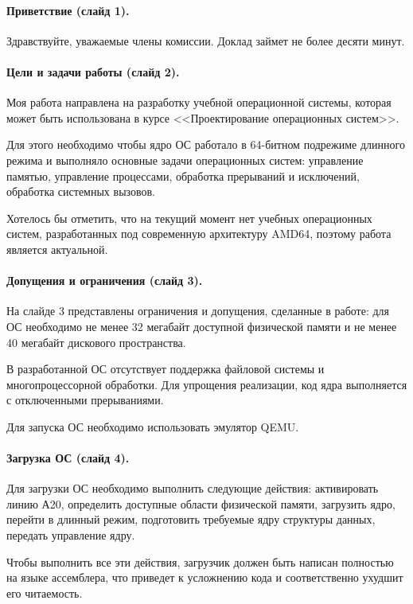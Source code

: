 \documentclass[12pt]{article}
\begin{document}
\paragraph{Приветствие (слайд 1).}
Здравствуйте, уважаемые члены комиссии. Доклад займет не более десяти минут.

\paragraph{Цели и задачи работы (слайд 2).}
Моя работа направлена на разработку учебной операционной системы, которая может
быть использована в курсе <<Проектирование операционных систем>>.

Для этого необходимо чтобы ядро ОС работало в 64-битном подрежиме длинного режима
и выполняло основные задачи операционных систем: управление памятью, управление
процессами, обработка прерываний и исключений, обработка системных вызовов.

Хотелось бы отметить, что на текущий момент нет учебных операционных систем,
разработанных под современную архитектуру AMD64, поэтому работа является актуальной.

\paragraph{Допущения и ограничения (слайд 3).}
На слайде 3 представлены ограничения и допущения, сделанные в работе: для ОС необходимо
не менее 32 мегабайт доступной физической памяти и не менее 40 мегабайт дискового пространства.

В разработанной ОС отсутствует поддержка файловой системы и многопроцессорной обработки.
Для упрощения реализации, код ядра выполняется с отключенными прерываниями.

Для запуска ОС необходимо использовать эмулятор QEMU.

\paragraph{Загрузка ОС (слайд 4).}
Для загрузки ОС необходимо выполнить следующие действия: активировать линию А20,
определить доступные области физической памяти, загрузить ядро, перейти в длинный
режим, подготовить требуемые ядру структуры данных, передать управление ядру.

Чтобы выполнить все эти действия, загрузчик должен быть написан полностью на языке
ассемблера, что приведет к усложнению кода и соответственно ухудшит его читаемость.
\end{document}
